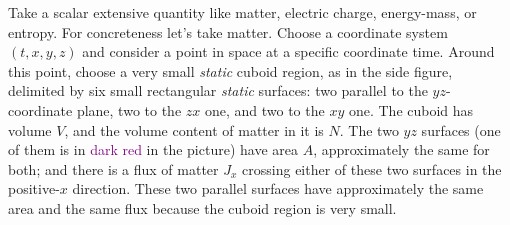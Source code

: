 \documentclass[a4paper,12pt,%
onecolumn,oneside,%
british%
]{memoir}
\renewcommand*{\|}[1][]{\nonscript\:#1\vert\nonscript\:\mathopen{}}
\newcommand*{\energym}{energy-mass}
\newcommand*{\yN}{N}
\newcommand*{\yJ}{J}
\begin{document}
Take a scalar extensive quantity like matter, electric charge, \energym, or entropy. For concreteness let's take matter. Choose a coordinate system $(t,x,y,z)$ and consider a point in space at a specific coordinate time.
%
%
Around this point, choose a very small \emph{static} cuboid region, as in the side figure, delimited by six small rectangular \emph{static} surfaces: two parallel to the $yz$-coordinate plane, two to the $zx$ one, and two to the $xy$ one. The cuboid has volume $V$, and the volume content of matter in it is $\yN$. The two $yz$ surfaces (one of them is in \textcolor{purple}{dark red} in the picture) have area $A$, approximately the same for both; and there is a flux of matter $\yJ_{x}$ crossing either of these two surfaces in the positive-$x$ direction. These two parallel surfaces have approximately the same area and the same flux because the cuboid region is very small.
\end{document}
